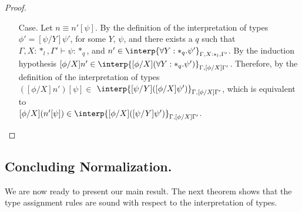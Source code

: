 \begin{proof}
\begin{itemize}
\item[Case.]  Let $n \equiv n'[\psi]$.  By the definition of the
  interpretation of types $\phi' = [\psi/Y]\psi'$, for some $Y$, $\psi$, and 
  there exists a $q$ such that $\Gamma,X:*_l,\Gamma' \vdash \psi:*_q$, and 
  $n' \in \interp{\forall Y:*_q.\psi'}_{\Gamma,X:*_l,\Gamma'}$.  By the 
  induction hypothesis 
  $[\phi/X]n' \in \interp{[\phi/X](\forall Y:*_q.\psi')}_{\Gamma,[\phi/X]\Gamma'}$.
  Therefore, by the definition of the interpretation of types\\
  $([\phi/X]n')[\psi] \in$
  $ \interp{[\psi/Y]([\phi/X]\psi')}_{\Gamma,[\phi/X]\Gamma'}$, which is equivalent
  to \\
  $[\phi/X](n'[\psi]) \in \interp{[\phi/X]([\psi/Y]\psi')}_{\Gamma,[\phi/X]\Gamma'}$.
\end{itemize}
\end{proof}

\subsection{Concluding Normalization.}
\label{subsec:soundness_of_typing_ssf}
We are now ready to present our main result.  The next theorem shows
that the type assignment rules are sound with respect to the
interpretation of types.  


